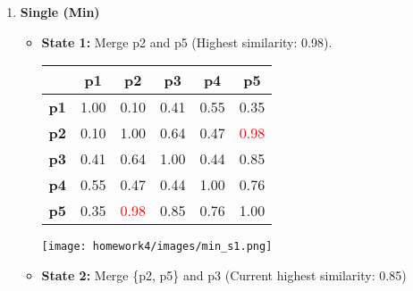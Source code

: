 \documentclass[11pt]{article}
\begin{document}
\begin{enumerate}
    \begin{enumerate}
        \item \textbf{Single (Min)}
        \begin{itemize}
            \item \textbf{State 1:} Merge p2 and p5 (Highest similarity: 0.98).
\begin{table}[H]
        \centering
        \begin{minipage}{0.7\textwidth}  %
            \centering
            \begin{minipage}{0.4\textwidth}
                \centering
                \label{tb:exp1}
                \begin{tabular}{ l| c | c | c | c | c}\hline
                           & \textbf{p1} & \textbf{p2} & \textbf{p3} & \textbf{p4} & \textbf{p5} \\ \hline
                    \bf p1 & 1.00        & 0.10        & 0.41        & 0.55        & 0.35        \\
                    \bf p2 & 0.10        & 1.00        & 0.64        & 0.47        &  \textcolor{red}{0.98}        \\
                    \bf p3 & 0.41        & 0.64        & 1.00        & 0.44        & 0.85        \\
                    \bf p4 & 0.55        & 0.47        & 0.44        & 1.00        & 0.76        \\
                    \bf p5 & 0.35        &  \textcolor{red}{0.98}        & 0.85        & 0.76        & 1.00        \\
                    \hline
                \end{tabular}
            \end{minipage}%
            \hfill
            \begin{minipage}{0.3\textwidth}
                \centering
                \texttt{[image: homework4/images/min\_s1.png]}
                \label{fig:your-image}
            \end{minipage}
        \end{minipage}
    \end{table}
    
    \item \textbf{State 2:} Merge \{p2, p5\} and p3 (Current highest similarity: 0.85)


\end{itemize}
\end{enumerate}
\end{enumerate}
\end{document}
